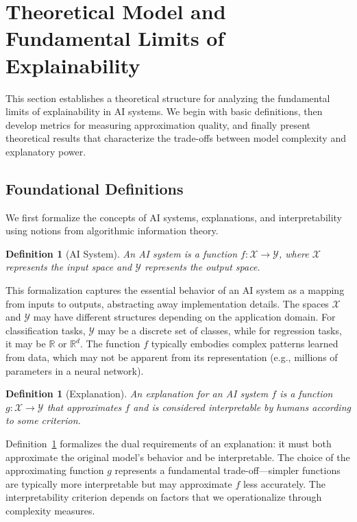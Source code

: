 \documentclass[11pt,letter,leqno]{article}
\newtheorem{definition}[theorem]{Definition}
\begin{document}
\section{Theoretical Model and Fundamental Limits of Explainability}
\label{sec:framework}

This section establishes a theoretical structure for analyzing the fundamental limits of explainability in AI systems.  We begin with basic definitions, then develop metrics for measuring approximation quality, and finally present theoretical results that characterize the trade-offs between model complexity and explanatory power.

\subsection{Foundational Definitions}
\label{subsec:definitions}

We first formalize the concepts of AI systems, explanations, and interpretability using notions from algorithmic information theory.

\begin{definition}[AI System]
\label{def:ai-system}
An AI system is a function $f: \mathcal{X} \rightarrow \mathcal{Y}$, where $\mathcal{X}$ represents the input space and $\mathcal{Y}$ represents the output space.
\end{definition}

This formalization captures the essential behavior of an AI system as a mapping from inputs to outputs, abstracting away implementation details.  The spaces $\mathcal{X}$ and $\mathcal{Y}$ may have different structures depending on the application domain.  For classification tasks, $\mathcal{Y}$ may be a discrete set of classes, while for regression tasks, it may be $\mathbb{R}$ or $\mathbb{R}^d$. The function $f$ typically embodies complex patterns learned from data, which may not be apparent from its representation (e.g., millions of parameters in a neural network).

\begin{definition}[Explanation]
\label{def:explanation}
An explanation for an AI system $f$ is a function $g: \mathcal{X} \rightarrow \mathcal{Y}$ that approximates $f$ and is considered interpretable by humans according to some criterion.
\end{definition}

Definition~\ref{def:explanation} formalizes the dual requirements of an explanation: it must both approximate the original model's behavior and be interpretable.  The choice of the approximating function $g$ represents a fundamental trade-off---simpler functions are typically more interpretable but may approximate $f$ less accurately.  The interpretability criterion depends on factors that we operationalize through complexity measures.
\end{document}
